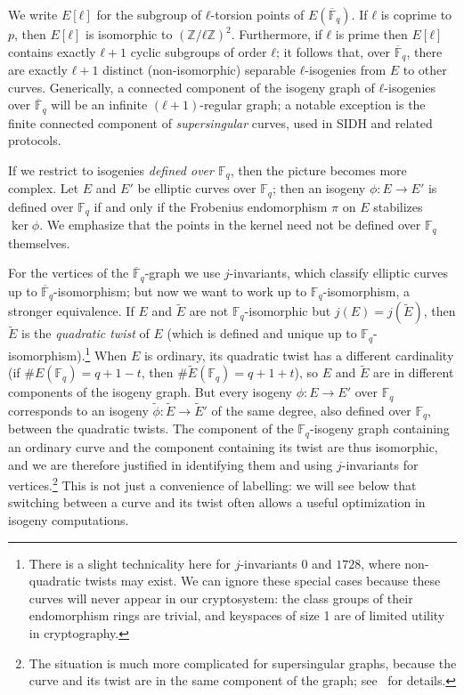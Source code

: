\documentclass{llncs}
\newcommand{\F}{\mathbb{F}}
\newcommand{\Fbar}{\overline{\mathbb{F}}}
\begin{document}
We write $E[ℓ]$ for the subgroup of $ℓ$-torsion points of
$E(\Fbar_q)$.  If $ℓ$ is coprime to $p$, then $E[ℓ]$ is isomorphic to
$(ℤ/ℓℤ)^2$.  Furthermore, if $ℓ$ is prime then $E[ℓ]$ contains exactly
$ℓ+1$ cyclic subgroups of order $ℓ$; it follows that, over $\Fbar_q$,
there are exactly $ℓ+1$ distinct (non-isomorphic) separable $ℓ$-isogenies 
from $E$ to other curves.
Generically, a connected component of the isogeny graph of
$ℓ$-isogenies over $\Fbar_q$ will be an infinite $(ℓ+1)$-regular
graph; a notable exception is the finite connected component of
\emph{supersingular} curves, used in SIDH and related protocols.

If we restrict to isogenies \emph{defined over $\F_q$}, 
then the picture becomes more complex.  
Let $E$ and $E'$ be elliptic curves over $\F_q$;
then an isogeny $ϕ:E→E'$ is defined over $\F_q$
if and only if the Frobenius endomorphism $\pi$ on $E$ stabilizes $\ker ϕ$.
We emphasize that the points in the kernel need not
be defined over $\F_q$ themselves.

For the vertices of the $\Fbar_q$-graph
we use $j$-invariants,
which classify elliptic curves up to
$\Fbar_q$-isomorphism;
but now we want to work up to $\F_q$-isomorphism,
a stronger equivalence.
If $E$ and $\tilde{E}$ are not $\F_q$-isomorphic
but $j(E) = j(\tilde{E})$,
then $\tilde{E}$ is the \emph{quadratic twist} of $E$
(which is defined and unique up to $\F_q$-isomorphism).\footnote{
    There is a slight technicality here for $j$-invariants $0$ and $1728$,
    where non-quadratic twists may exist.
    We can ignore these special cases
    because these curves will never appear in our cryptosystem:
    the class groups of their endomorphism rings are trivial,
    and keyspaces of size 1 are of limited utility in cryptography.
}
When $E$ is ordinary,
its quadratic twist has a different cardinality
(if $\#E(\F_q) = q + 1 - t$, then $\#\tilde{E}(\F_q) = q + 1 + t$),
so $E$ and $\tilde{E}$ are in different components of the isogeny graph.
But every isogeny $\phi: E \to E'$ over $\F_q$
corresponds to an isogeny $\tilde{\phi}: \tilde{E} \to \tilde{E}'$
of the same degree, also defined over $\F_q$, between the quadratic twists.
The component of the $\F_q$-isogeny graph containing an ordinary curve 
and the component containing its twist are thus isomorphic,
and we are therefore justified in identifying them
and using $j$-invariants for vertices.\footnote{
    The situation is much more complicated for supersingular graphs,
    because the curve and its twist are in the same component
    of the graph; see~\cite[\S2]{DelfsG16} for details.
}
This is not just a convenience of labelling:
we will see below that switching between a curve and its twist
often allows a useful optimization in isogeny computations.
\end{document}
